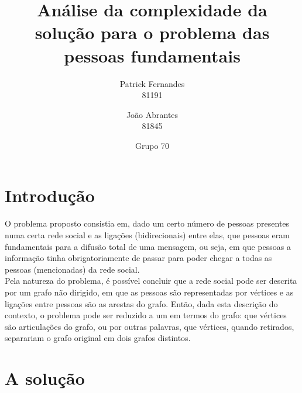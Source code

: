 \documentclass{article}
\title{Análise da complexidade da solução para o problema das pessoas fundamentais}
\author{Patrick Fernandes\\81191 \and João Abrantes\\81845}
\date{Grupo 70}
\begin{document}
\maketitle
\section{Introdução}
O problema proposto consistia em, dado um certo número de pessoas presentes numa certa rede social e as ligações (bidirecionais) entre elas, que pessoas eram fundamentais para a difusão total de uma mensagem, ou seja, em que pessoas a informação tinha obrigatoriamente de passar para poder chegar a todas as pessoas (mencionadas) da rede social.\\
Pela natureza do problema, é possível concluir que a rede social pode ser descrita por um grafo não dirigido, em que as pessoas são representadas por vértices e as ligações entre pessoas são as arestas do grafo. Então, dada esta descrição do contexto, o problema pode ser reduzido a um em termos do grafo: que vértices são articulações do grafo, ou por outras palavras, que vértices, quando retirados, separariam o grafo original em dois grafos distintos.
\section{A solução}
\end{document}
